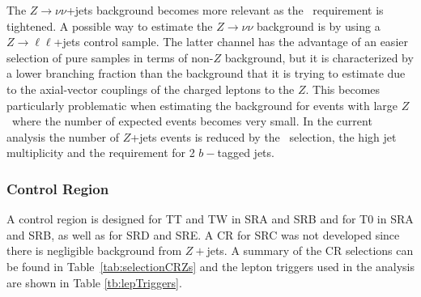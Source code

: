 The $Z \rightarrow \nu\nu$+jets background becomes more relevant as the \MET\ requirement is tightened. A possible way to estimate the $Z \rightarrow
\nu \nu$ background is by using a $Z \rightarrow \ell \ell$+jets control
sample. The latter channel has the advantage of an easier selection of
pure samples in terms of non-$Z$ background, but it is characterized by a
lower branching fraction than the background that it is trying to
estimate due to the  axial-vector couplings of the charged leptons to the $Z$.  This becomes particularly problematic when estimating the
background for events with large $Z$ \pT\ where the number of expected
events becomes very small. In the current analysis the number of
$Z$+jets events is reduced by the \MET\ selection, the high jet
multiplicity and the requirement for 2 $b-$tagged jets.


   
\subsubsection{Control Region}
A control region is designed for TT and TW in SRA and SRB and for T0 in SRA and SRB, as well as for SRD and SRE.  A CR for SRC was not developed since there is negligible background from $Z+$jets.  A summary of the CR selections can be found in Table~\ref{tab:selectionCRZs} and the lepton triggers used in the analysis are shown in Table \ref{tb:lepTriggers}.  \\

